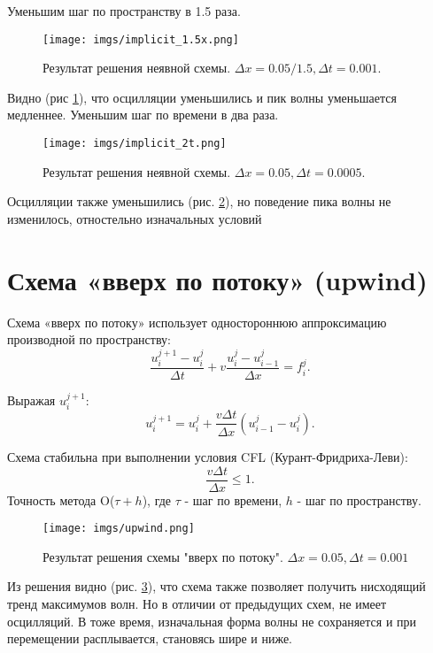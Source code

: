 \newpage
Уменьшим шаг по пространству в 1.5 раза. 

\begin{figure}[h]  %
	\centering
	\texttt{[image: imgs/implicit\_1.5x.png]}  %
	\caption{Результат решения неявной схемы. $\Delta x = 0.05 / 1.5, \Delta t = 0.001$.}  %
	\label{fig:implicit_1.5x}  %
\end{figure}
Видно (рис \ref{fig:implicit_1.5x}), что осцилляции уменьшились и пик волны уменьшается медленнее.
\newpage
Уменьшим шаг по времени в два раза. 
\begin{figure}[h]  %
	\centering
	\texttt{[image: imgs/implicit\_2t.png]}  %
	\caption{Результат решения неявной схемы. $\Delta x = 0.05 , \Delta t = 0.0005$.}  %
	\label{fig:implicit_2t}  %
\end{figure}

Осцилляции также уменьшились (рис. \ref{fig:implicit_2t}), но поведение пика волны не изменилось, отностельно изначальных условий
\newpage

\section{Схема «вверх по потоку» (upwind)}

Схема «вверх по потоку» использует одностороннюю аппроксимацию производной по пространству:
$$
	\frac{u_i^{j+1} - u_i^j}{\Delta t} + v \frac{u_i^j - u_{i-1}^j}{\Delta x} = f_{i}^j.
$$

Выражая $u_i^{j+1}$:
$$
	u_i^{j+1} = u_i^j + \frac{v \Delta t}{\Delta x} \left( u_{i-1}^j - u_i^j \right).
$$

Схема стабильна при выполнении условия CFL (Курант-Фридриха-Леви)\cite{Patankar1984}:
\begin{equation}
	\boxed{\frac{v \Delta t}{\Delta x} \leq 1}.
	\label{eq:ust2}
\end{equation}
Точность метода O($\tau + h$), где $\tau$ - шаг по времени, $h$ - шаг по пространству.
\begin{figure}[h]  %
	\centering
	\texttt{[image: imgs/upwind.png]}  %
	\caption{Результат решения  схемы "вверх по потоку". $\Delta x = 0.05 , \Delta t = 0.001$}  %
	\label{fig:upwind}  %
\end{figure}
\newline
 
Из решения видно (рис. \ref{fig:upwind}), что схема также позволяет получить нисходящий тренд максимумов волн.  Но в отличии от предыдущих схем, не имеет осцилляций. В тоже время, изначальная форма волны не сохраняется и при перемещении расплывается, становясь шире и ниже. 

